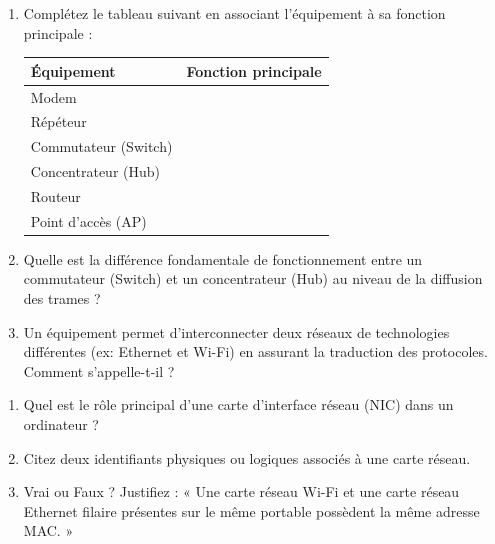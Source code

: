 \documentclass[11pt]{article}
\begin{document}
\begin{exercice}
\begin{enumerate}
    \item Complétez le tableau suivant en associant l'équipement à sa fonction principale :
    \begin{tabular}{|l|p{8cm}|}
        \hline
        \textbf{Équipement} & \textbf{Fonction principale} \\ \hline
        Modem & \\ \hline
        Répéteur & \\ \hline
        Commutateur (Switch) & \\ \hline
        Concentrateur (Hub) & \\ \hline
        Routeur & \\ \hline
        Point d'accès (AP) & \\ \hline
    \end{tabular}
    \item Quelle est la différence fondamentale de fonctionnement entre un commutateur (Switch) et un concentrateur (Hub) au niveau de la diffusion des trames ?
    \item Un équipement permet d'interconnecter deux réseaux de technologies différentes (ex: Ethernet et Wi-Fi) en assurant la traduction des protocoles. Comment s'appelle-t-il ?
\end{enumerate}
\end{exercice}

\begin{exercice}
\begin{enumerate}
    \item Quel est le rôle principal d'une carte d'interface réseau (NIC) dans un ordinateur ?
    \item Citez deux identifiants physiques ou logiques associés à une carte réseau.
    \item Vrai ou Faux ? Justifiez : « Une carte réseau Wi-Fi et une carte réseau Ethernet filaire présentes sur le même portable possèdent la même adresse MAC. »
\end{enumerate}
\end{exercice}
\end{document}
